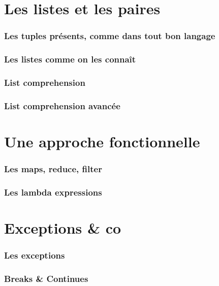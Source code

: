 \documentclass{beamer}
\begin{document}
\section{Les listes et les paires}
\label{sec:lists}

\begin{frame}
  \frametitle{Les tuples présents, comme dans tout bon langage}
\end{frame}

\begin{frame}
  \frametitle{Les listes comme on les connaît}
\end{frame}

\begin{frame}
  \frametitle{List comprehension}
\end{frame}

\begin{frame}
  \frametitle{List comprehension avancée}
\end{frame}

\section{Une approche fonctionnelle}
\label{sec:functionnal}

\begin{frame}
  \frametitle{Les maps, reduce, filter}
\end{frame}

\begin{frame}
  \frametitle{Les lambda expressions}
\end{frame}

\section{Exceptions \& co}
\label{sec:except}

\begin{frame}
  \frametitle{Les exceptions}
\end{frame}

\begin{frame}
  \frametitle{Breaks \& Continues}
\end{frame}
\end{document}
